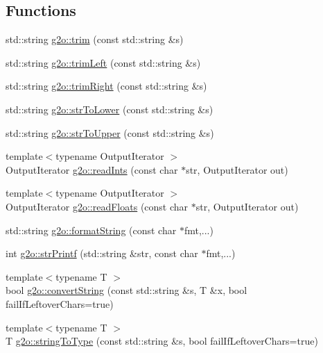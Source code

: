 \subsection*{Functions}
\begin{DoxyCompactItemize}
\item 
std\+::string \mbox{\hyperlink{group__utils_ga437d185a62afe16a99f27f3b12e108d7}{g2o\+::trim}} (const std\+::string \&s)
\item 
std\+::string \mbox{\hyperlink{group__utils_gad2277aa8d0784f7001f7f27396d59f98}{g2o\+::trim\+Left}} (const std\+::string \&s)
\item 
std\+::string \mbox{\hyperlink{group__utils_ga7305cbf5d345c0e352ac2baa93b7d30a}{g2o\+::trim\+Right}} (const std\+::string \&s)
\item 
std\+::string \mbox{\hyperlink{group__utils_ga18235ef006dc52e266590591f895157d}{g2o\+::str\+To\+Lower}} (const std\+::string \&s)
\item 
std\+::string \mbox{\hyperlink{group__utils_ga70dfb4dd2aeae37635cf2b5bef6321a9}{g2o\+::str\+To\+Upper}} (const std\+::string \&s)
\item 
{\footnotesize template$<$typename Output\+Iterator $>$ }\\Output\+Iterator \mbox{\hyperlink{group__utils_gae501003a8f6b60afb846857fdb82174d}{g2o\+::read\+Ints}} (const char $\ast$str, Output\+Iterator out)
\item 
{\footnotesize template$<$typename Output\+Iterator $>$ }\\Output\+Iterator \mbox{\hyperlink{group__utils_ga88353c6cfc2e519df07814ca577e71ec}{g2o\+::read\+Floats}} (const char $\ast$str, Output\+Iterator out)
\item 
std\+::string \mbox{\hyperlink{group__utils_gadc1d37473e0e8c6a73fb46b19239d2d1}{g2o\+::format\+String}} (const char $\ast$fmt,...)
\item 
int \mbox{\hyperlink{group__utils_gacce5cae59e8c97bf3f4ff581c6534d03}{g2o\+::str\+Printf}} (std\+::string \&str, const char $\ast$fmt,...)
\item 
{\footnotesize template$<$typename T $>$ }\\bool \mbox{\hyperlink{group__utils_ga599c46f6984e9a2147fac39324e9fadc}{g2o\+::convert\+String}} (const std\+::string \&s, T \&x, bool fail\+If\+Leftover\+Chars=true)
\item 
{\footnotesize template$<$typename T $>$ }\\T \mbox{\hyperlink{group__utils_ga9dac39a213d269b8d68fb698bf82873a}{g2o\+::string\+To\+Type}} (const std\+::string \&s, bool fail\+If\+Leftover\+Chars=true)

\end{DoxyCompactItemize}
